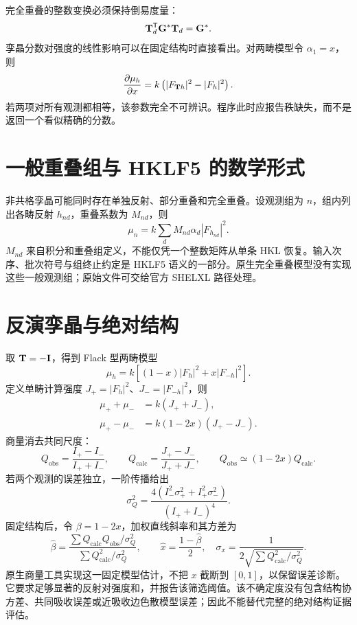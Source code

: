 完全重叠的整数变换必须保持倒易度量：
\begin{equation}
\mathbf{T}_d^{\mathsf T}\mathbf{G}^*\mathbf{T}_d=\mathbf{G}^*.
\end{equation}
孪晶分数对强度的线性影响可以在固定结构时直接看出。对两畴模型令 $\alpha_1=x$，则
\begin{equation}
\frac{\partial\mu_h}{\partial x}=k\left(|F_{\mathbf{T} h}|^2-|F_h|^2\right).
\end{equation}
若两项对所有观测都相等，该参数完全不可辨识。程序此时应报告秩缺失，而不是返回一个看似精确的分数。

\section{一般重叠组与 HKLF5 的数学形式}
非共格孪晶可能同时存在单独反射、部分重叠和完全重叠。设观测组为 $n$，组内列出各畴反射 $h_{nd}$，重叠系数为 $M_{nd}$，则
\begin{equation}
\mu_n=k\sum_dM_{nd}\alpha_d|F_{h_{nd}}|^2.
\end{equation}
$M_{nd}$ 来自积分和重叠组定义，不能仅凭一个整数矩阵从单条 HKL 恢复。输入次序、批次符号与组终止约定是 HKLF5 语义的一部分。原生完全重叠模型没有实现这些一般观测组；原始文件可交给官方 SHELXL 路径处理。

\section{反演孪晶与绝对结构}
取 $\mathbf{T}=-\mathbf{I}$，得到 Flack 型两畴模型~\cite{parsons2013}
\begin{equation}
\mu_h=k[(1-x)|F_h|^2+x|F_{-h}|^2].
\end{equation}
定义单畴计算强度 $J_+=|F_h|^2$、$J_-=|F_{-h}|^2$，则
\begin{align}
\mu_++\mu_-&=k(J_++J_-),\\
\mu_+-\mu_-&=k(1-2x)(J_+-J_-).
\end{align}
商量消去共同尺度：
\begin{equation}
Q_{\mathrm{obs}}=\frac{I_+-I_-}{I_++I_-},\qquad
Q_{\mathrm{calc}}=\frac{J_+-J_-}{J_++J_-},\qquad
Q_{\mathrm{obs}}\simeq(1-2x)Q_{\mathrm{calc}}.
\end{equation}
若两个观测的误差独立，一阶传播给出
\begin{equation}
\sigma_Q^2=\frac{4(I_-^2\sigma_+^2+I_+^2\sigma_-^2)}{(I_++I_-)^4}.
\end{equation}
固定结构后，令 $\beta=1-2x$，加权直线斜率和其方差为
\begin{equation}
\widehat\beta=\frac{\sum Q_{\mathrm{calc}}Q_{\mathrm{obs}}/\sigma_Q^2}
{\sum Q_{\mathrm{calc}}^2/\sigma_Q^2},\qquad
\widehat x=\frac{1-\widehat\beta}{2},\quad
\sigma_x=\frac{1}{2\sqrt{\sum Q_{\mathrm{calc}}^2/\sigma_Q^2}}.
\end{equation}
原生商量工具实现这一固定模型估计，不把 $x$ 截断到 $[0,1]$，以保留误差诊断。它要求足够显著的反射对强度和，并报告该筛选阈值。该不确定度没有包含结构协方差、共同吸收误差或近吸收边色散模型误差；因此不能替代完整的绝对结构证据评估。

